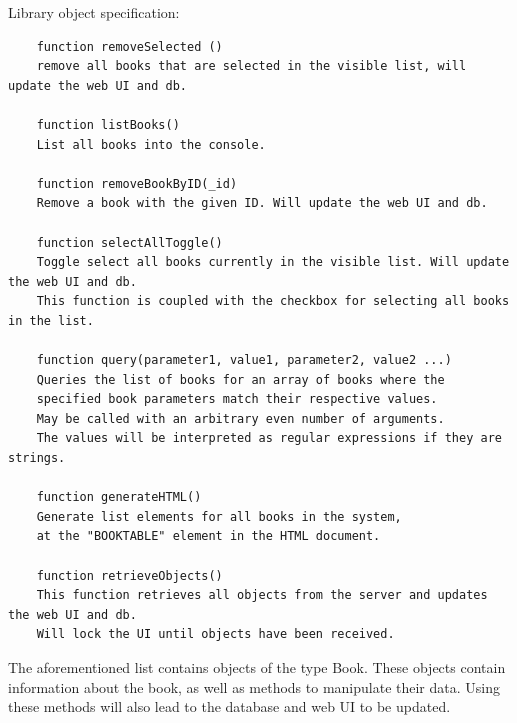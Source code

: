 Library object specification:
\begin{verbatim}
    function removeSelected ()
    remove all books that are selected in the visible list, will update the web UI and db.
    
    function listBooks()
    List all books into the console.
    
    function removeBookByID(_id)
    Remove a book with the given ID. Will update the web UI and db.

    function selectAllToggle()
    Toggle select all books currently in the visible list. Will update the web UI and db.
    This function is coupled with the checkbox for selecting all books in the list.
    
    function query(parameter1, value1, parameter2, value2 ...)
    Queries the list of books for an array of books where the 
    specified book parameters match their respective values.
    May be called with an arbitrary even number of arguments. 
    The values will be interpreted as regular expressions if they are strings.

    function generateHTML()
    Generate list elements for all books in the system, 
    at the "BOOKTABLE" element in the HTML document.
    
    function retrieveObjects()
    This function retrieves all objects from the server and updates the web UI and db. 
    Will lock the UI until objects have been received.

\end{verbatim}


The aforementioned list contains objects of the type Book. These objects contain information about the book, as well as methods to manipulate their data. Using these methods will also lead to the database and web UI to be updated.

